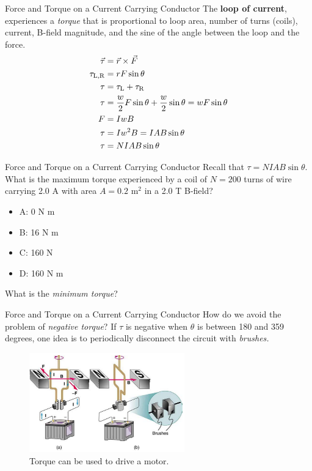 \documentclass{beamer}
\begin{document}
\begin{frame}{Force and Torque on a Current Carrying Conductor}
\small
The \textbf{loop of current}, experiences a \textit{torque} that is proportional to loop area, number of turns (coils), current, B-field magnitude, and the sine of the angle between the loop and the force.
\begin{align}
\vec{\tau} &= \vec{r} \times \vec{F} \\
\tau_{\rm L,R} &= r F \sin\theta \\
\tau &= \tau_{\rm L} + \tau_{\rm R} \\
\tau &= \frac{w}{2}F\sin\theta + \frac{w}{2}\sin\theta = wF\sin\theta \\
F &= I w B \\
\tau &= I w^2 B = I A B \sin\theta \\
\tau &= N I A B \sin\theta
\end{align}
\end{frame}

\begin{frame}{Force and Torque on a Current Carrying Conductor}
Recall that $\boxed{\tau = N I A B \sin\theta}$.  What is the maximum torque experienced by a coil of $N = 200$ turns of wire carrying 2.0 A with area $A = 0.2$ m$^2$ in a 2.0 T B-field?
\begin{itemize}
\item A: 0 N m
\item B: 16 N m
\item C: 160 N
\item D: 160 N m
\end{itemize}
\footnotesize
What is the \textit{minimum torque}?
\end{frame}

\begin{frame}{Force and Torque on a Current Carrying Conductor}
How do we avoid the problem of \textit{negative torque}?  If $\tau$ is negative when $\theta$ is between 180 and 359 degrees, one idea is to periodically disconnect the circuit with \textit{brushes.}
\begin{figure}
\centering
\includegraphics[width=0.6\textwidth]{figures/motor.png}
\caption{\label{fig:motor} Torque can be used to drive a motor.}
\end{figure}
\end{frame}
\end{document}
